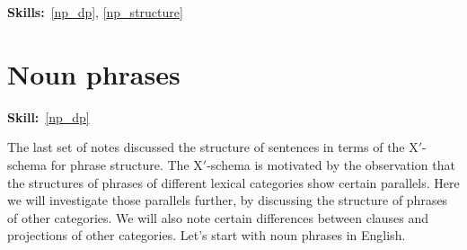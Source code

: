 \documentclass{article}
\begin{document}
\maketitle
\subtitle{Topic 7 Course Notes: Nonverbal XP's Part 1\\
Arguments of N \& the DP Hypothesis}
\hfill{}\textbf{Skills:}~\ref{np_dp},
\ref{np_structure}
\section{Noun phrases}
\hfill{}\textbf{Skill:}~\ref{np_dp}

The last set of notes discussed the structure of sentences in terms of the X$'$-schema for phrase structure.
The X$'$-schema is motivated by the observation that the structures of phrases of different lexical categories show certain parallels.
Here we will investigate  those parallels further, by discussing the structure of phrases of other categories.
We will also note certain differences between clauses and projections of other categories.
Let's start with noun phrases in English.
\end{document}
